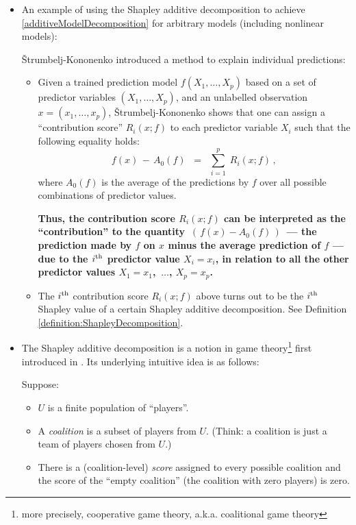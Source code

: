 \begin{itemize}
\item
	An example of using the Shapley additive decomposition to achieve \eqref{additiveModelDecomposition}
	for arbitrary models (including nonlinear models):
	
	\v{S}trumbelj-Kononenko \cite{Strumbelj2010}
	introduced a method to {\color{red}explain individual predictions}:
	\begin{itemize}
	\item
		Given a trained prediction model $f(X_{1},\ldots,X_{p})$
		based on a set of predictor variables $(X_{1},\ldots,X_{p})$, and
		an unlabelled observation $x = (x_{1},\ldots,x_{p})$,
		\v{S}trumbelj-Kononenko \cite{Strumbelj2010} shows that
		one can assign a ``contribution score'' $R_{i}(x;f)$
		to each predictor variable $X_{i}$
		such that the following equality holds:
		\begin{equation*}
		f(x) \, - \, A_{0}(f)
		\;\; = \;\;
			\overset{p}{\underset{i=1}{\sum}}\;
			R_{i}(x;f)\,,
		\end{equation*}
		where $A_{0}(f)$ is the average of the predictions by $f$
		over all possible combinations of predictor values.

		\vskip 0.2cm
		\textbf{Thus, the contribution score $R_{i}(x;f)$ can be interpreted
		as the ``{\color{red}contribution}'' to the quantity \,$\left(\,f(x) - A_{0}(f)\,\right)$\,
		 --- the prediction made by $f$ on $x$ minus the average prediction of $f$ ---
		due to the $i^{\textnormal{th}}$ predictor value $X_{i} = x_{i}$,
		in relation to all the other predictor values
		$X_{1} = x_{1}$, \,$\ldots$\;, $X_{p} = x_{p}$.}
		\vskip 0.2cm
		
	\item
		The $i^{\textnormal{th}}$ contribution score $R_{i}(x;f)$ above
		turns out to be the $i^{\textnormal{th}}$ {\color{red}Shapley value} of
		a certain {\color{red}Shapley additive decomposition}.
		See Definition \eqref{definition:ShapleyDecomposition}.
	\end{itemize}

\item
	The Shapley additive decomposition is a notion
	in game theory\footnote{more precisely, cooperative game theory, a.k.a. coalitional game theory}
	first introduced in \cite{Shapley1953}.
	Its underlying intuitive idea is as follows:

	Suppose:
	\begin{itemize}
	\item
		$U$ is a finite population of ``players''.
	\item
		A \textit{coalition} is a subset of players from $U$.
		(Think: a coalition is just a team of players chosen from $U$.)
	\item
		There is a (coalition-level) \textit{score} assigned to every possible coalition
		and the score of the ``empty coalition'' (the coalition with zero players) is zero.
	\end{itemize}
	

\end{itemize}
